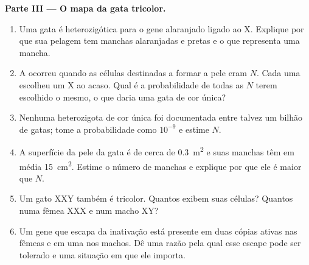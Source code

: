 \begin{problem}
\medskip
\noindent\textbf{Parte III --- O mapa da gata tricolor.}
\begin{enumerate}[resume]
  \item Uma gata é heterozigótica para o gene alaranjado ligado ao X.
        Explique por que sua pelagem tem manchas alaranjadas e pretas
        e o que representa uma mancha.
  \item A  ocorreu quando as células destinadas a
        formar a pele eram $N$. Cada uma escolheu um X ao acaso. Qual
        é a probabilidade de todas as $N$ terem escolhido o mesmo, o
        que daria uma gata de cor única?
  \item Nenhuma heterozigota de cor única foi documentada entre talvez
        um bilhão de gatas; tome a probabilidade como $10^{-9}$ e
        estime $N$.
  \item A superfície da pele da gata é de cerca de \qty{0.3}{m^2} e
        suas manchas têm em média \qty{15}{cm^2}. Estime o número de
        manchas e explique por que ele é maior que $N$.
  \item Um gato XXY também é tricolor. Quantos 
        exibem suas células? Quantos numa fêmea XXX e num macho XY?
  \item Um gene que escapa da inativação está presente em duas cópias
        ativas nas fêmeas e em uma nos machos. Dê uma razão pela qual
        esse escape pode ser tolerado e uma situação em que ele
        importa.
\end{enumerate}


\end{problem}
